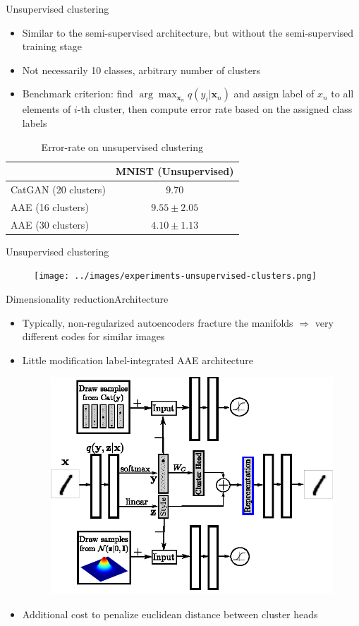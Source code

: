 \documentclass[10pt]{beamer}
\newcommand{\vect}[1]{\boldsymbol{#1}} %
\begin{document}
\begin{frame}{Unsupervised clustering}
\begin{itemize}
  \item Similar to the semi-supervised architecture, but without the semi-supervised training stage
  \item Not necessarily 10 classes, arbitrary number of clusters
  \item Benchmark criterion: find $ \arg\max_{\vect{x}_n} q(y_i | \vect x_n)  $ and assign label of $ x_n $ to all elements of $ i $-th cluster, then compute error rate based on the assigned class labels
\end{itemize}
\begin{table}
  \centering
  \small
  \begin{tabular}{l || c}
    \toprule
                         & MNIST (Unsupervised) \\ \midrule
    CatGAN (20 clusters) & $ 9.70 $             \\
    AAE (16 clusters)    & $ 9.55 \pm 2.05 $    \\
    AAE (30 clusters)    & $ 4.10 \pm 1.13 $    \\ \bottomrule
  \end{tabular}
  \caption{Error-rate on unsupervised clustering}
\end{table}
\end{frame}

\begin{frame}{Unsupervised clustering}
\begin{figure}
  \centering
  \texttt{[image: ../images/experiments-unsupervised-clusters.png]}
\end{figure}
\end{frame}

\begin{frame}{Dimensionality reduction}{Architecture}
\begin{itemize}
  \item Typically, non-regularized autoencoders fracture the manifolds $ \Rightarrow $ very different codes for similar images
  \item Little modification label-integrated AAE architecture
  \begin{figure}
    \centering
    \includegraphics[width=0.6\linewidth]{../images/aae-architecture-04.png}
  \end{figure}
  \item Additional cost to penalize euclidean distance between cluster heads
\end{itemize}
\end{frame}
\end{document}
